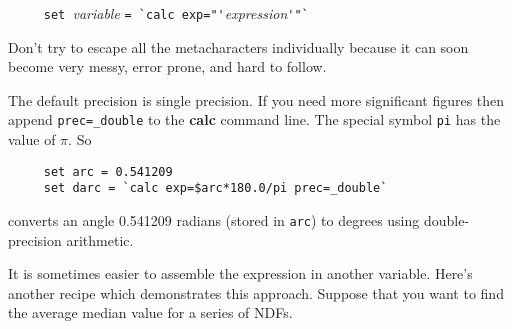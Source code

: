 \documentclass[twoside,11pt]{article}
\newcommand{\xref}[3]{#1}
\newcommand{\NDFref}[1]{\xref{#1}{sun33}{}}
\begin{document}
\verb#     set #{\em variable} \verb#= `calc exp="'#{\em expression}\verb#'"`#

Don't try to escape all the metacharacters individually because it can
soon become very messy, error prone, and hard to follow.
\medskip

The default precision is single precision.  If you need more
significant figures then append {\tt prec=\_double} to the {\bf calc}
command line.  The special symbol {\tt pi} has the value of $\pi$.  So

\small
\begin{verbatim}
     set arc = 0.541209
     set darc = `calc exp=$arc*180.0/pi prec=_double`
\end{verbatim}
\normalsize
converts an angle 0.541209 radians (stored in {\tt arc}) to degrees
using double-precision arithmetic.

It is sometimes easier to assemble the expression in another variable.
Here's another recipe which demonstrates this approach.  Suppose that you
want to find the average median value for a series of \NDFref{{\sf NDF}s}.
\end{document}
